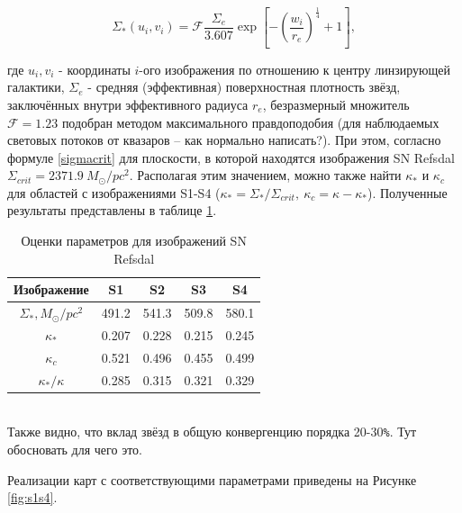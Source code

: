 \begin{equation}\label{vaucouleurs}
\Sigma_*\left(u_{i}, v_{i}\right)=\mathcal{F} \frac{\Sigma_{e}}{3.607} \exp \left[-\left(\frac{w_{i}}{r_{e}}\right)^{\frac{1}{4}}+1\right], 
\end{equation}

где $u_{i}, v_{i}$ - координаты $i$-ого изображения по отношению к центру линзирующей галактики, $\Sigma_e$ - средняя (эффективная) поверхностная плотность звёзд, заключённых внутри эффективного радиуса $r_e$, безразмерный множитель $\mathcal{F}=1.23$ подобран методом максимального правдоподобия (для наблюдаемых световых потоков от квазаров -- как нормально написать?). При этом, согласно формуле \eqref{sigmacrit} для плоскости, в которой находятся изображения SN Refsdal  $\Sigma_{crit} = 2371.9 \ M_{\odot}/pc^2 $. Располагая этим значением, можно также найти $\kappa_*$ и $\kappa_c$ для областей с изображениями S1-S4 ($\kappa_*=\Sigma_* /\Sigma_{crit}, \ \kappa_c = \kappa-\kappa_* $). Полученные результаты представлены в таблице \ref{tab:params}.

\begin{table}[h!]
  \caption{Оценки параметров для изображений SN Refsdal}
   \label{tab:params}
  \centering
    \begin{tabular}{ | c | c | c | c | c |}
    \hline
    Изображение & S1 & S2 & S3 & S4 \\ \hline
    $\Sigma_*, M_{\odot}/pc^2$ & 491.2 & 541.3 & 509.8 & 580.1\\ \hline
    $\kappa_*$ & 0.207 &  0.228 & 0.215 & 0.245 \\ \hline
    $\kappa_c$ & 0.521 & 0.496 & 0.455 & 0.499 \\ \hline
    $\kappa_*/\kappa$ & 0.285 & 0.315 & 0.321 & 0.329 \\ \hline
    \end{tabular}
\end{table}
\\
Также видно, что вклад звёзд в общую конвергенцию порядка 20-30\verb|%|. Тут обосновать для чего это.

Реализации карт с соответствующими параметрами приведены на Рисунке \ref{fig:s1s4}.

